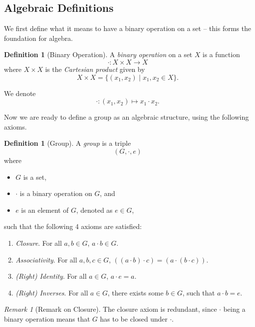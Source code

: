 \documentclass{article}
\theoremstyle{definition}
\newtheorem{definition}[theorem]{Definition}
\theoremstyle{remark}
\newtheorem{remark}[theorem]{Remark}
\newcommand{\pqty}[1]{\left(#1\right)}
\newcommand{\set}[2]{\{#1\mid #2\}}
\newcommand{\functiondomain}[3]{#1:#2\to #3}
\newcommand{\functionmap}[3]{#1:#2\mapsto #3}
\begin{document}
\subsection{Algebraic Definitions}
\label{sec:algebraic-definitions}

We first define what it means to have a binary operation on a set -- this forms the foundation for algebra.

\begin{definition}[Binary Operation]
    \label{def:binary-operation}%
    A \emph{binary operation} on a set \(X\) is a function
    \[
        \functiondomain{\cdot}{X \times X}{X}
    \]
    where \(X \times X\) is the \emph{Cartesian product} given by
    \[
        X \times X = \set{\pqty{x_1, x_2}}{x_1, x_2 \in X}.
    \]
    
    We denote
    \[
        \functionmap{\cdot}{\pqty{x_1, x_2}}{x_1 \cdot x_2}.
    \]
\end{definition}

Now we are ready to define a group as an algebraic structure, using the following axioms.

\begin{definition}[Group]
    \label{def:group}%
    A \emph{group} is a triple
    \[
        \pqty{G, \cdot, e}
    \]
    where
    \begin{itemize}
        \item \(G\) is a set,
        \item \(\cdot\) is a binary operation on \(G\), and
        \item \(e\) is an element of \(G\), denoted as \(e \in G\),
    \end{itemize}
    such that the following 4 axioms are satisfied:
    \begin{enumerate}
        \item \emph{Closure}. For all \(a, b \in G\), \(a \cdot b \in G\).
        \item \emph{Associativity}. For all \(a, b, c \in G\), \(
        \pqty{\pqty{a \cdot b} \cdot c} = \pqty{a \cdot \pqty{b \cdot c}}\).
        \item \emph{(Right) Identity}. For all \(a \in G\), \(a \cdot e = a\).
        \item \emph{(Right) Inverses}. For all \(a \in G\), there exists some \(b \in G\), such that \(a \cdot b = e\).
    \end{enumerate}
\end{definition}

\begin{remark}[Remark on Closure]
    The closure axiom is redundant, since \(\cdot\) being a binary operation means that \(G\) has to be closed under \(\cdot\).
\end{remark}
\end{document}
